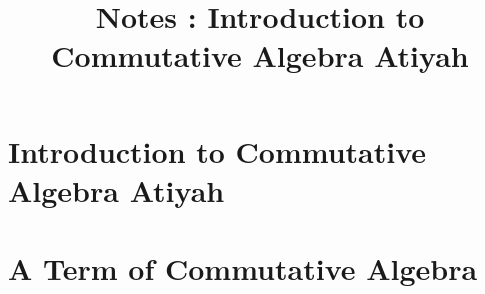 \documentclass{article}
\title{Notes : Introduction to Commutative Algebra Atiyah}
\begin{document}
\tableofcontents
{}
\newpage\part{Introduction to Commutative Algebra Atiyah}
\newpage\part{A Term of Commutative Algebra}
\end{document}
